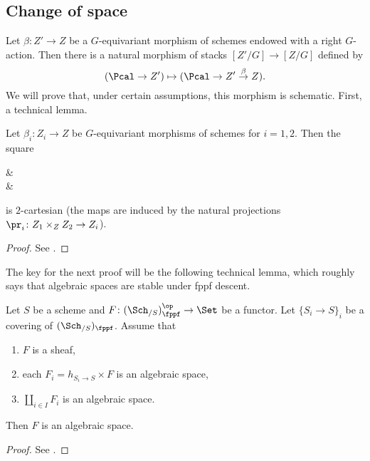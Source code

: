         \subsection{Change of space}
            Let $\beta\colon Z' \to Z$ be a $G$-equivariant morphism of schemes endowed with a right $G$-action. Then there is a natural morphism of stacks $[Z'/G] \to [Z/G]$ defined by \[(\Pcal \to Z') \mapsto (\Pcal \to Z' \stackrel{\beta}{\to} Z). \] We will prove that, under certain assumptions, this morphism is schematic.
            First, a technical lemma.
            \begin{lemma}
                \label{lemma:wang_2_3_2}
                Let $\beta_i\colon Z_i \to Z$ be $G$-equivariant morphisms of schemes for $i=1,2$. Then the square 
                \begin{diag}
                     \ar[d] \ar[r] & \left[Z_1 / G\right] \ar[d] \\
                    \left[Z_2 / G\right] \ar[r] & \left[Z/G\right]
                \end{diag}
                is $2$-cartesian (the maps are induced by the natural projections $\pr_i\colon Z_1 \times_Z Z_2 \to Z_i$).
            \end{lemma}
            \begin{proof}
                See \cite[Lemma~2.3.2]{wang:moduli}.
            \end{proof}
            The key for the next proof will be the following technical lemma, which roughly says that algebraic spaces are stable under fppf descent.
            \begin{lemma}
                \label{lemma:stacks_04Sk}
                Let $S$ be a scheme and $F\colon (\Sch_{/S})^{\op}_{\fppf} \to \Set$ be a functor. Let $\{S_i \to S\}_i$ be a covering of $(\Sch_{/S})_{\fppf}$. Assume that 
                \begin{enumerate}[label=(\arabic*)]
                    \item $F$ is a sheaf,
                    \item each $F_i = h_{S_i \to S} \times F$ is an algebraic space,
                    \item $\coprod_{i \in I} F_i$ is an algebraic space.
                \end{enumerate}
                Then $F$ is an algebraic space.
            \end{lemma}
            \begin{proof}
                See \cite[\href{https://stacks.math.columbia.edu/tag/04Sk}{Lemma 04Sk}]{stacks-project}.
            \end{proof}

